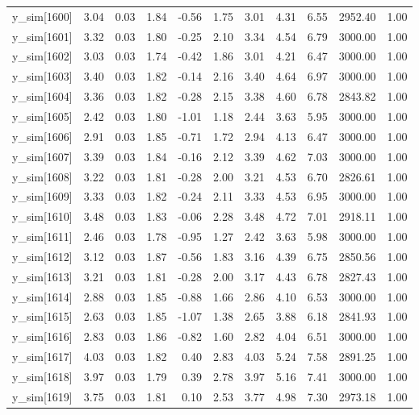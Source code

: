 \begin{table}[ht]
\begin{tabular}{rrrrrrrrrrr}
  y\_sim[1600] & 3.04 & 0.03 & 1.84 & -0.56 & 1.75 & 3.01 & 4.31 & 6.55 & 2952.40 & 1.00 \\ 
  y\_sim[1601] & 3.32 & 0.03 & 1.80 & -0.25 & 2.10 & 3.34 & 4.54 & 6.79 & 3000.00 & 1.00 \\ 
  y\_sim[1602] & 3.03 & 0.03 & 1.74 & -0.42 & 1.86 & 3.01 & 4.21 & 6.47 & 3000.00 & 1.00 \\ 
  y\_sim[1603] & 3.40 & 0.03 & 1.82 & -0.14 & 2.16 & 3.40 & 4.64 & 6.97 & 3000.00 & 1.00 \\ 
  y\_sim[1604] & 3.36 & 0.03 & 1.82 & -0.28 & 2.15 & 3.38 & 4.60 & 6.78 & 2843.82 & 1.00 \\ 
  y\_sim[1605] & 2.42 & 0.03 & 1.80 & -1.01 & 1.18 & 2.44 & 3.63 & 5.95 & 3000.00 & 1.00 \\ 
  y\_sim[1606] & 2.91 & 0.03 & 1.85 & -0.71 & 1.72 & 2.94 & 4.13 & 6.47 & 3000.00 & 1.00 \\ 
  y\_sim[1607] & 3.39 & 0.03 & 1.84 & -0.16 & 2.12 & 3.39 & 4.62 & 7.03 & 3000.00 & 1.00 \\ 
  y\_sim[1608] & 3.22 & 0.03 & 1.81 & -0.28 & 2.00 & 3.21 & 4.53 & 6.70 & 2826.61 & 1.00 \\ 
  y\_sim[1609] & 3.33 & 0.03 & 1.82 & -0.24 & 2.11 & 3.33 & 4.53 & 6.95 & 3000.00 & 1.00 \\ 
  y\_sim[1610] & 3.48 & 0.03 & 1.83 & -0.06 & 2.28 & 3.48 & 4.72 & 7.01 & 2918.11 & 1.00 \\ 
  y\_sim[1611] & 2.46 & 0.03 & 1.78 & -0.95 & 1.27 & 2.42 & 3.63 & 5.98 & 3000.00 & 1.00 \\ 
  y\_sim[1612] & 3.12 & 0.03 & 1.87 & -0.56 & 1.83 & 3.16 & 4.39 & 6.75 & 2850.56 & 1.00 \\ 
  y\_sim[1613] & 3.21 & 0.03 & 1.81 & -0.28 & 2.00 & 3.17 & 4.43 & 6.78 & 2827.43 & 1.00 \\ 
  y\_sim[1614] & 2.88 & 0.03 & 1.85 & -0.88 & 1.66 & 2.86 & 4.10 & 6.53 & 3000.00 & 1.00 \\ 
  y\_sim[1615] & 2.63 & 0.03 & 1.85 & -1.07 & 1.38 & 2.65 & 3.88 & 6.18 & 2841.93 & 1.00 \\ 
  y\_sim[1616] & 2.83 & 0.03 & 1.86 & -0.82 & 1.60 & 2.82 & 4.04 & 6.51 & 3000.00 & 1.00 \\ 
  y\_sim[1617] & 4.03 & 0.03 & 1.82 & 0.40 & 2.83 & 4.03 & 5.24 & 7.58 & 2891.25 & 1.00 \\ 
  y\_sim[1618] & 3.97 & 0.03 & 1.79 & 0.39 & 2.78 & 3.97 & 5.16 & 7.41 & 3000.00 & 1.00 \\ 
  y\_sim[1619] & 3.75 & 0.03 & 1.81 & 0.10 & 2.53 & 3.77 & 4.98 & 7.30 & 2973.18 & 1.00 \\ 

\end{tabular}
\end{table}

